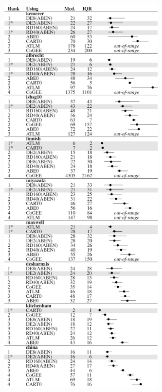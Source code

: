 \begin{figure}[!thbp]
\begin{center}
\begin{minipage}{0.45\linewidth}
\includegraphics[width=3.3in]{mre.png}
\end{minipage}%
~~%
\begin{minipage}{0.45\linewidth}
\end{minipage}
\end{center}
\end{figure}
